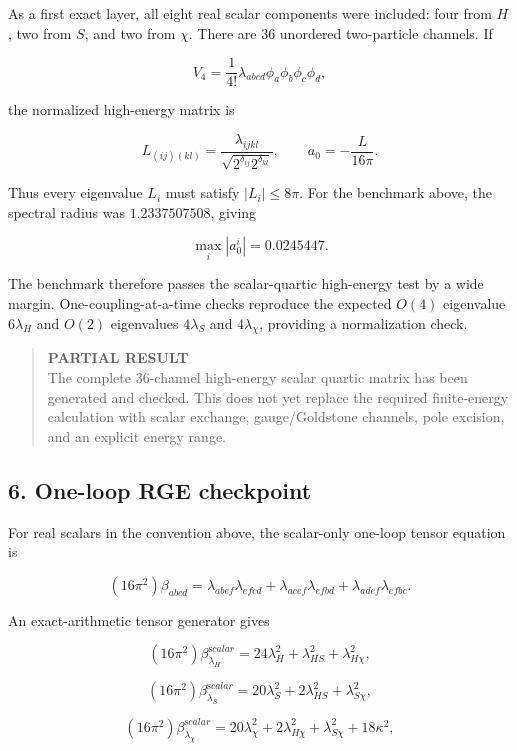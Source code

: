 \documentclass[
]{article}
\begin{document}
As a first exact layer, all eight real scalar components were included:
four from \(H\), two from \(S\), and two from \(\chi\). There are 36
unordered two-particle channels. If

\[
V_4=\frac1{4!}\lambda_{abcd}\phi_a\phi_b\phi_c\phi_d,
\]

the normalized high-energy matrix is

\[
L_{(ij)(kl)}=
\frac{\lambda_{ijkl}}
{\sqrt{2^{\delta_{ij}}2^{\delta_{kl}}}},
\qquad
a_0=-\frac{L}{16\pi}.
\]

Thus every eigenvalue \(L_i\) must satisfy \(|L_i|\le8\pi\). For the
benchmark above, the spectral radius was \(1.2337507508\), giving

\[
\max_i|a_0^i|=0.0245447.
\]

The benchmark therefore passes the scalar-quartic high-energy test by a
wide margin. One-coupling-at-a-time checks reproduce the expected
\(O(4)\) eigenvalue \(6\lambda_H\) and \(O(2)\) eigenvalues
\(4\lambda_S\) and \(4\lambda_\chi\), providing a normalization check.

\begin{quote}
\textbf{PARTIAL RESULT}\\
The complete 36-channel high-energy scalar quartic matrix has been
generated and checked. This does not yet replace the required
finite-energy calculation with scalar exchange, gauge/Goldstone
channels, pole excision, and an explicit energy range.
\end{quote}

\hypertarget{one-loop-rge-checkpoint}{%
\subsection{6. One-loop RGE checkpoint}\label{one-loop-rge-checkpoint}}

For real scalars in the convention above, the scalar-only one-loop
tensor equation is

\[
(16\pi^2)\beta_{abcd}=
\lambda_{abef}\lambda_{efcd}
+\lambda_{acef}\lambda_{efbd}
+\lambda_{adef}\lambda_{efbc}.
\]

An exact-arithmetic tensor generator gives

\[
(16\pi^2)\beta_{\lambda_H}^{\mathrm scalar}
=24\lambda_H^2+\lambda_{HS}^2+\lambda_{H\chi}^2,
\]

\[
(16\pi^2)\beta_{\lambda_S}^{\mathrm scalar}
=20\lambda_S^2+2\lambda_{HS}^2+\lambda_{S\chi}^2,
\]

\[
(16\pi^2)\beta_{\lambda_\chi}^{\mathrm scalar}
=20\lambda_\chi^2+2\lambda_{H\chi}^2+\lambda_{S\chi}^2+18\kappa^2,
\]
\end{document}
